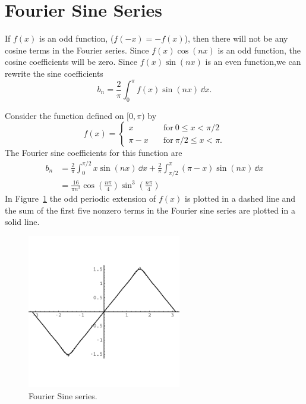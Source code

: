 \section{Fourier Sine Series}

If $f(x)$ is an odd function, ($f(-x) = - f(x)$), then there will not be any
cosine terms in the Fourier series.  Since $f(x) \cos(n x)$ is an 
odd function, the cosine coefficients will be zero.
Since $f(x) \sin(n x)$ is an even function,we can rewrite the sine coefficients
\[ b_n = \frac{2}{\pi} \int_0^\pi f(x) \sin(n x)\,\dd x.\]




\begin{Example}
  Consider the function defined on $[0, \pi)$ by
  \[ f(x) = 
  \begin{cases}
    x \quad &\mathrm{for}\ 0 \leq x < \pi/2 \\
    \pi - x \quad &\mathrm{for}\ \pi/2 \leq x < \pi.
  \end{cases}
  \]
  The Fourier sine coefficients for this function are
  \begin{align*}
    b_n     &= \frac{2}{\pi} \int_0^{\pi/2} x \sin(n x)\,\dd x
    + \frac{2}{\pi} \int_{\pi/2}^\pi (\pi - x)\sin(n x)\,\dd x \\
    &= \frac{16}{\pi n^2} \cos\left( \frac{n \pi}{4} \right)
    \sin^3\left(\frac{n \pi}{4}\right)             
  \end{align*}
  In Figure~\ref{sin_hill_5} the odd periodic extension of $f(x)$ is
  plotted in a dashed line and the sum of the first five nonzero
  terms in the Fourier sine series are plotted in a solid line.

  \begin{figure}[h!]
    \begin{center}
      \includegraphics[width=0.6\textwidth]{ode/fourier_series/sin_h5}
    \end{center}
    \caption{Fourier Sine series.}
    \label{sin_hill_5}
  \end{figure}

\end{Example}









